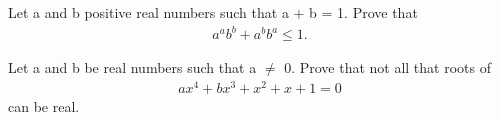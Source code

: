 \item Let a and b positive real numbers such that a + b = 1. Prove that
\begin{align*}
a^a b^b + a^b b^a \leq 1.
\end{align*}

\item Let a and b be real numbers such that a $\neq$ 0. Prove that not all that roots of 
\begin{align}
ax^4 + bx^3 + x^2 + x + 1 = 0
\end{align} 
can be real.
